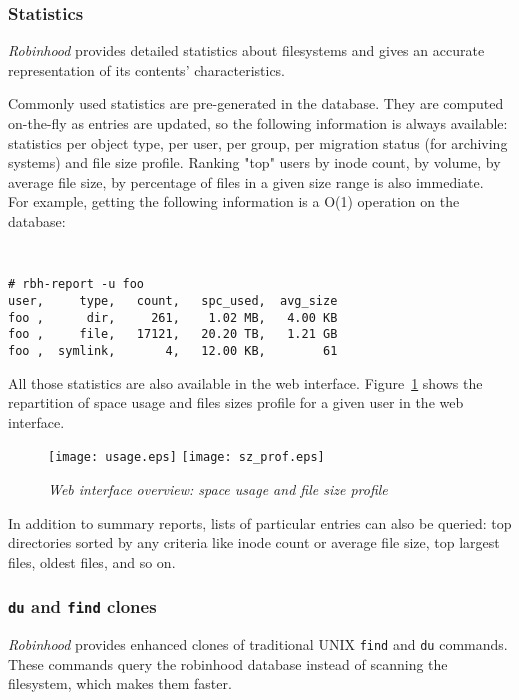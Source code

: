 \documentclass[conference]{IEEEtran}
\begin{document}
\subsubsection{Statistics}

\emph{Robinhood} provides detailed statistics about filesystems and gives an
accurate representation of its contents' characteristics.

Commonly used statistics are pre-generated in the database. They are computed
on-the-fly as entries are updated, so the following information is always
available: statistics per object type, per user, per group,
per migration status (for archiving systems) and file size profile. Ranking
"top" users by inode count, by volume, by average file size, by percentage of
files in a given size range is also immediate.\\
For example, getting the following information is a O(1) operation on
the database:
{\tt \small
\begin{verbatim}
# rbh-report -u foo
user,     type,   count,   spc_used,  avg_size
foo ,      dir,     261,    1.02 MB,   4.00 KB
foo ,     file,   17121,   20.20 TB,   1.21 GB
foo ,  symlink,       4,   12.00 KB,        61
\end{verbatim}
}

All those statistics are also available in the web interface.
Figure~\ref{fig:szprof} shows the repartition of space usage and files sizes
profile for a given user in the web interface.

\begin{figure}[here]
\centering
\texttt{[image: usage.eps]}
\texttt{[image: sz\_prof.eps]}
\caption{\it Web interface overview: space usage and file size profile}
\label{fig:szprof}
\end{figure}

In addition to summary reports, lists of particular entries can also be queried:
top directories sorted by any criteria like inode count or average file size,
top largest files, oldest files, and so on.

\subsubsection{{\tt du} and {\tt find} clones}

\emph{Robinhood} provides enhanced clones of traditional UNIX {\tt find} and {\tt du} commands.
These commands query the robinhood database instead of scanning the filesystem, which makes them faster.
\end{document}

